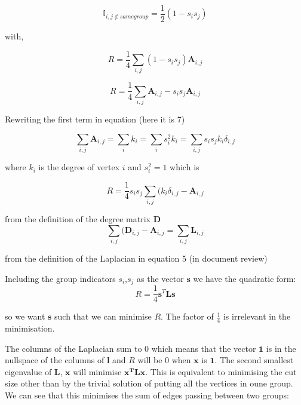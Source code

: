 \begin{equation}
\mathbb{I}_{i,j\notin samegroup}=\frac{1}{2}(1-s_i s_j)
\end{equation}

with,

\begin{equation}
R=\frac{1}{4}\sum_{i,j}(1-s_i s_j)\mathbf{A}_{i,j}
\end{equation}

\begin{equation}
R = \frac{1}{4}\sum_{i,j}\mathbf{A}_{i,j}-s_i s_j \mathbf{A}_{i,j}
\end{equation}

Rewriting the first term in equation (here it is 7)

\begin{equation}
\sum_{i,j}\mathbf{A}_{i,j}=\sum_i k_i = \sum_i s_i ^2 k_i = \sum_{i,j} s_i s_j k_i \delta_{i,j}
\end{equation}

where $k_i$ is the degree of vertex $i$ and $s_i^2 = 1$ which is

\begin{equation}
R = \frac{1}{4}s_i s_j \sum_{i,j}(k_i \delta_{i,j} - \mathbf{A}_{i,j}
\end{equation}


from the definition of the degree matrix $\mathbf{D}$
\begin{equation}
\sum_{i,j} (\mathbf{D}_{i,j} -\mathbf{A}_{i,j} = \sum_{i,j} \mathbf{L}_{i,j}
\end{equation}

from the definition of the Laplacian in equation 5 (in document review)

Including the group indicators $s_i$,$s_j$ as the vector $\mathbf{s}$ we have the quadratic form:
\begin{equation}
R=\frac{1}{4}\mathbf{s}^T\mathbf{L}\mathbf{s}
\end{equation}

so we want $\mathbf{s}$ such that we can minimise $R$. The factor of $\frac{1}{4}$ is irrelevant in the minimisation.

The columns of the Laplacian sum to 0 which means that the vector $\mathbf{1}$ is in the nullspace of the columns of $\mathbf{l}$ and $R$ will be 0 when $\mathbf{x}$ is $\mathbf{1}$. The second smallest eigenvalue of $\mathbf{L}$, $\mathbf{x}$ will minimise $\mathbf{x^T}\mathbf{L}\mathbf{x}$.
This is equivalent to minimising the cut size other than by the trivial solution of putting all the vertices in oune group. We can see that this minimises the sum of edges passing between two groups:

